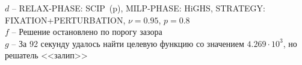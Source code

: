\documentclass[%
	11pt,
	a4paper,
	utf8,
		]{article}
\begin{document}
{	\hspace*{3mm}$ d $ -- {\footnotesize RELAX-PHASE: SCIP~(p), MILP-PHASE: HiGHS, STRATEGY: FIXATION+PERTURBATION, $ \nu = 0.95 $, $ p = 0.8 $}\\[-7mm]
	
	\hspace*{3mm}$ f $ -- {\footnotesize Решение остановлено по порогу зазора}\\[-7mm]
	
	\hspace*{3mm}$ g $ -- {\footnotesize За 92 секунду удалось найти целевую функцию со значением $ 4.269 \cdot 10^{3} $, но решатель <<залип>>}\\[-7mm]
}

\vspace*{5mm}
\end{document}
